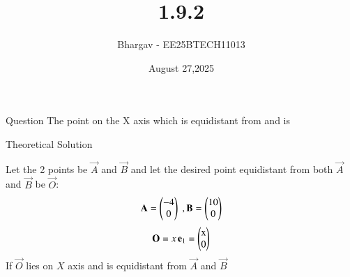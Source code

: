 \documentclass{beamer}
\title %
{1.9.2}
\date{August 27,2025}
\author %
{Bhargav - EE25BTECH11013}
\begin{document}
\frame{\titlepage}
\begin{frame}{Question}
The point on the X axis which is equidistant from  and  is\\ 
\end{frame}



\begin{frame}{Theoretical Solution}

Let the 2 points be $\vec{A}$ and $\vec{B}$ and let the desired point equidistant from both $\vec{A}$ and $\vec{B}$ be $\vec{O}$:
\begin{align}
    \vec{A}=\begin{myvec}{-4\\0}\end{myvec} \;, \vec{B}=\begin{myvec}{10\\0} \end{myvec}
\end{align}
\begin{align}
\vec{O} = x\,\mathbf e_1= \myvec{$x$ \\ $0$} \\
\end{align}
If $\vec{O}$ lies on $X$ axis and is equidistant from $\vec{A}$ and $\vec{B}$ \\


\end{frame}
\end{document}
